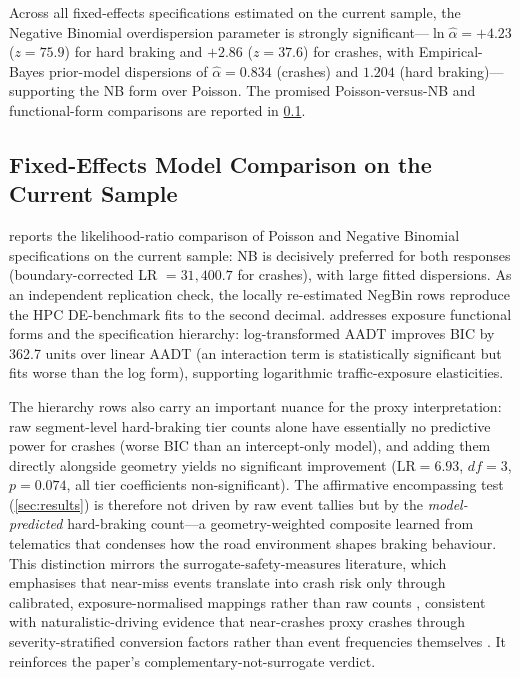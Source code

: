 \documentclass[letterpaper,8pt]{extarticle}  %
\begin{document}
\begin{doublespacing}
\begin{linenumbers}
\FloatBarrier


Across all fixed-effects specifications estimated on the current sample, the Negative Binomial overdispersion parameter is strongly significant---$\ln\hat\alpha=+4.23$ ($z=75.9$) for hard braking and $+2.86$ ($z=37.6$) for crashes, with Empirical-Bayes prior-model dispersions of $\hat\alpha=0.834$ (crashes) and $1.204$ (hard braking)---supporting the NB form over Poisson. The promised Poisson-versus-NB and functional-form comparisons are reported in \cref{sec:model-comparison-local}.

\subsection{Fixed-Effects Model Comparison on the Current Sample}\label{sec:model-comparison-local}

 reports the likelihood-ratio comparison of Poisson and Negative Binomial specifications on the current sample: NB is decisively preferred for both responses (boundary-corrected LR $=31{,}400.7$ for crashes), with large fitted dispersions. As an independent replication check, the locally re-estimated NegBin rows reproduce the HPC DE-benchmark fits to the second decimal.  addresses exposure functional forms and the specification hierarchy: log-transformed AADT improves BIC by 362.7 units over linear AADT (an interaction term is statistically significant but fits worse than the log form), supporting logarithmic traffic-exposure elasticities.



\FloatBarrier

The hierarchy rows also carry an important nuance for the proxy interpretation: raw segment-level hard-braking tier counts alone have essentially no predictive power for crashes (worse BIC than an intercept-only model), and adding them directly alongside geometry yields no significant improvement (LR$=6.93$, $df=3$, $p=0.074$, all tier coefficients non-significant). The affirmative encompassing test (\cref{sec:results}) is therefore not driven by raw event tallies but by the \emph{model-predicted} hard-braking count---a geometry-weighted composite learned from telematics that condenses how the road environment shapes braking behaviour. This distinction mirrors the surrogate-safety-measures literature, which emphasises that near-miss events translate into crash risk only through calibrated, exposure-normalised mappings rather than raw counts \citep{Tarko2009SurrogateMeasures,Tarko2012UseCrash}, consistent with naturalistic-driving evidence that near-crashes proxy crashes through severity-stratified conversion factors rather than event frequencies themselves \citep{Guo2010EvaluatingRelationship}. It reinforces the paper's complementary-not-surrogate verdict.



\end{linenumbers}
\end{doublespacing}
\end{document}
